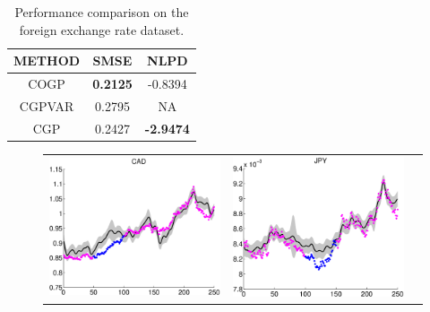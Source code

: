 \begin{table}[h]
\caption{Performance comparison on the foreign exchange rate dataset.}
\label{tab:fx}
\begin{center}
\begin{tabular}{c|c|c}
METHOD & SMSE & NLPD \\ \hline
COGP  & \textbf{0.2125} & -0.8394 \\
CGPVAR & 0.2795 & NA \\
CGP & 0.2427 & \textbf{-2.9474} \\
\end{tabular}
\end{center}
\end{table}

\begin{figure}
\centering
\begin{tabular}{ccc}
\includegraphics[scale=0.3]{figures/fxCAD.eps} &
\includegraphics[scale=0.3]{figures/fxJPY.eps} &

\end{tabular}
\end{figure}
